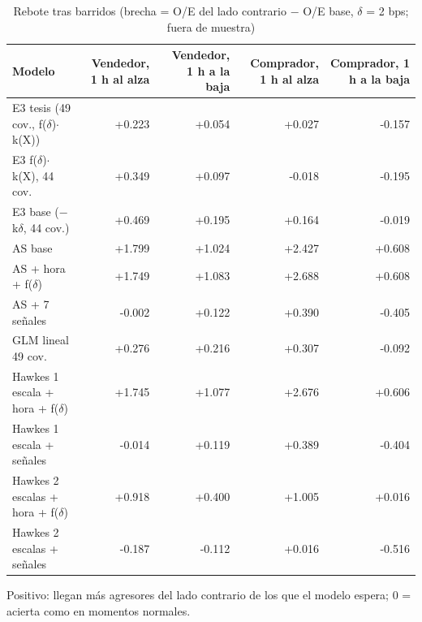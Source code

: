 \begin{table}[htbp]
\centering
\small
\caption{Rebote tras barridos (brecha = O/E del lado contrario $-$ O/E base, $\delta$ = 2 bps; fuera de muestra)}
\label{tab:T4_rebote}
\begin{tabular}{lrrrr}
\toprule
Modelo & Vendedor, 1 h al alza & Vendedor, 1 h a la baja & Comprador, 1 h al alza & Comprador, 1 h a la baja \\
\midrule
E3 tesis (49 cov., f($\delta$)$\cdot$k(X)) & +0.223 & +0.054 & +0.027 & -0.157 \\
E3 f($\delta$)$\cdot$k(X), 44 cov. & +0.349 & +0.097 & -0.018 & -0.195 \\
E3 base ($-$k$\delta$, 44 cov.) & +0.469 & +0.195 & +0.164 & -0.019 \\
AS base & +1.799 & +1.024 & +2.427 & +0.608 \\
AS + hora + f($\delta$) & +1.749 & +1.083 & +2.688 & +0.608 \\
AS + 7 señales & -0.002 & +0.122 & +0.390 & -0.405 \\
GLM lineal 49 cov. & +0.276 & +0.216 & +0.307 & -0.092 \\
Hawkes 1 escala + hora + f($\delta$) & +1.745 & +1.077 & +2.676 & +0.606 \\
Hawkes 1 escala + señales & -0.014 & +0.119 & +0.389 & -0.404 \\
Hawkes 2 escalas + hora + f($\delta$) & +0.918 & +0.400 & +1.005 & +0.016 \\
Hawkes 2 escalas + señales & -0.187 & -0.112 & +0.016 & -0.516 \\
\bottomrule
\end{tabular}
\par\smallskip\footnotesize Positivo: llegan más agresores del lado contrario de los que el modelo espera; 0 = acierta como en momentos normales.
\end{table}

